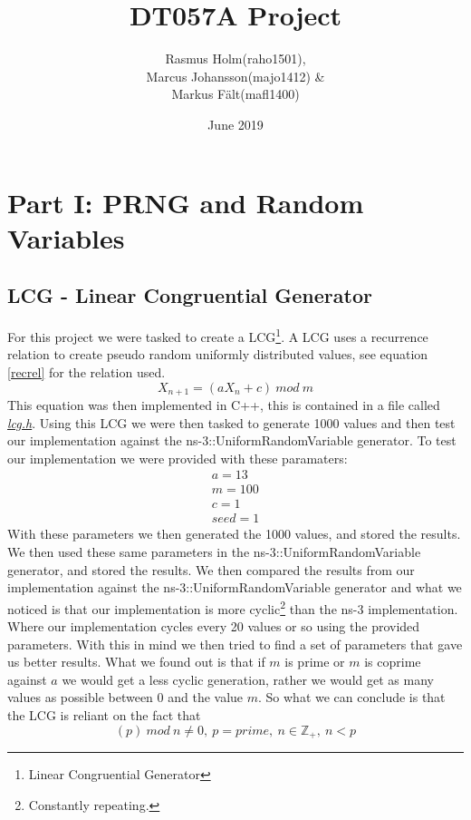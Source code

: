 \documentclass{article}
\title{DT057A Project}
\author{Rasmus Holm(raho1501),\\Marcus Johansson(majo1412) \&\\Markus Fält(mafl1400)}
\date{June 2019}
\begin{document}
\maketitle

\section{Part I: PRNG and Random Variables} \label{part1}
  \subsection{LCG - Linear Congruential Generator}
    For this project we were tasked to create a LCG\footnote{Linear Congruential Generator}. 
    A LCG uses a recurrence relation to create pseudo random uniformly distributed values, see equation \ref{recrel} for the relation used.
    \begin{equation} \label{recrel}
      X_{n+1} = (aX_{n} + c)\ mod\ m
    \end{equation}
    This equation was then implemented in C++, this is contained in a file called \href{https://github.com/NoRines/simulerings_projekt/blob/master/lcg.h}{\emph{lcg.h}}.
    Using this LCG we were then tasked to generate 1000 values and then test our implementation against the ns-3::UniformRandomVariable generator. 
    To test our implementation we were provided with these paramaters:
    \begin{align*}
      a=13 \\
      m=100 \\
      c=1 \\
      seed=1
    \end{align*}
    With these parameters we then generated the 1000 values, and stored the results.
    We then used these same parameters in the ns-3::UniformRandomVariable generator, and stored the results.
    We then compared the results from our implementation against the ns-3::UniformRandomVariable generator and what we noticed is that our implementation is more cyclic\footnote{Constantly repeating.} than the ns-3 implementation. 
    Where our implementation cycles every 20 values or so using the provided parameters.
    With this in mind we then tried to find a set of parameters that gave us better results.
    What we found out is that if $m$ is prime or $m$ is coprime against $a$ we would get a less cyclic generation, rather we would get as many values as possible between 0 and the value $m$.
    So what we can conclude is that the LCG is reliant on the fact that
    \begin{equation}
      (p)\ mod\ n \neq 0,\ p = prime,\ n \in \mathbb{Z}_{+} ,\ n < p
    \end{equation}
\end{document}
